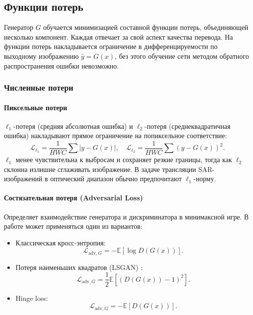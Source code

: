 \subsection{Функции потерь}
\label{subsec:losses}
Генератор $G$ обучается минимизацией составной функции потерь, объединяющей несколько компонент.
Каждая отвечает за свой аспект качества перевода.
На функции потерь накладывается ограничение в дифференцируемости по выходному изображению $\hat{y} = G(x)$, без этого обучение сети методом обратного распространения ошибки невозможно.

\subsubsection{Численные потери}

\paragraph{Пиксельные потери}
$\ell_1$-потеря (средняя абсолютная ошибка) и $\ell_2$-потеря (среднеквадратичная ошибка) накладывают прямое ограничение на попиксельное соответствие:
\begin{equation}
\mathcal{L}_{\ell_1} = \frac{1}{HWC} \sum |y - G(x)|, \quad \mathcal{L}_{\ell_2} = \frac{1}{HWC} \sum (y - G(x))^2.
\label{eq:l1_l2}
\end{equation}
$\ell_1$ менее чувствительна к выбросам и сохраняет резкие границы, тогда как $\ell_2$ склонна излишне сглаживать изображение.
В задаче трансляции SAR-изображений в оптический диапазон обычно предпочитают $\ell_1$-норму.

\paragraph{Состязательная потеря (Adversarial Loss)}
Определяет взаимодействие генератора и дискриминатора в минимаксной игре.
В работе может применяться один из вариантов:
\begin{itemize}
    \item Классическая кросс-энтропия:
    \begin{equation}
        \mathcal{L}_{\text{adv},G} = -\mathbb{E}[\log D(G(x))].
        \label{eq:adv_loss}
    \end{equation}
    \item Потеря наименьших квадратов (LSGAN) \cite{mao2017least}:
    \begin{equation}
        \mathcal{L}_{\text{adv},G} = \frac{1}{2}\mathbb{E}[(D(G(x))-1)^2].
        \label{eq:lsgan_loss}
    \end{equation}
    \item Hinge loss:
    \begin{equation}
        \mathcal{L}_{\text{adv},G} = -\mathbb{E}[D(G(x))].
        \label{eq:hinge_loss}
    \end{equation}
\end{itemize}


